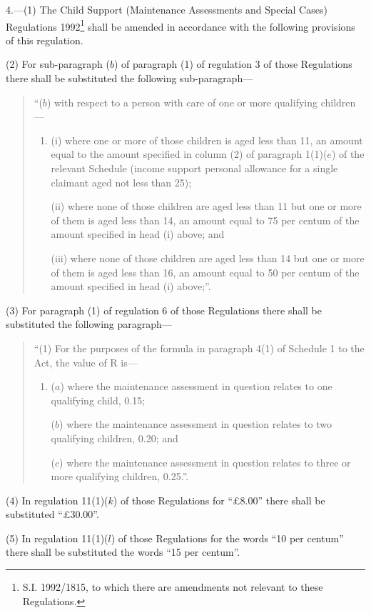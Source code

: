 \documentclass[12pt,a4paper]{article}
\begin{document}
4.—(1) The Child Support (Maintenance Assessments and Special Cases) Regulations 1992\footnote{\frenchspacing S.I. 1992/1815, to which there are amendments not relevant to these Regulations.} shall be amended in accordance with the following provisions of this regulation.

(2) For sub-paragraph ($b$) of paragraph (1) of regulation 3 of those Regulations there shall be substituted the following sub-paragraph—
\begin{quotation}
“($b$) with respect to a person with care of one or more qualifying children—
\begin{enumerate}\item[]
(i) where one or more of those children is aged less than 11, an amount equal to the amount specified in column (2) of paragraph 1(1)($e$) of the relevant Schedule (income support personal allowance for a single claimant aged not less than 25);

(ii) where none of those children are aged less than 11 but one or more of them is aged less than 14, an amount equal to 75 per centum of the amount specified in head (i) above; and

(iii) where none of those children are aged less than 14 but one or more of them is aged less than 16, an amount equal to 50 per centum of the amount specified in head (i) above;”.
\end{enumerate}
\end{quotation}

(3) For paragraph (1) of regulation 6 of those Regulations there shall be substituted the following paragraph—
\begin{quotation}
“(1) For the purposes of the formula in paragraph 4(1) of Schedule 1 to the Act, the value of R is—
\begin{enumerate}\item[]
($a$) where the maintenance assessment in question relates to one qualifying child, 0.15;

($b$) where the maintenance assessment in question relates to two qualifying children, 0.20; and

($c$) where the maintenance assessment in question relates to three or more qualifying children, 0.25.”.
\end{enumerate}
\end{quotation}

(4) In regulation 11(1)($k$) of those Regulations for “£8.00” there shall be substituted “£30.00”.

(5) In regulation 11(1)($l$) of those Regulations for the words “10 per centum” there shall be substituted the words “15 per centum”.
\end{document}
